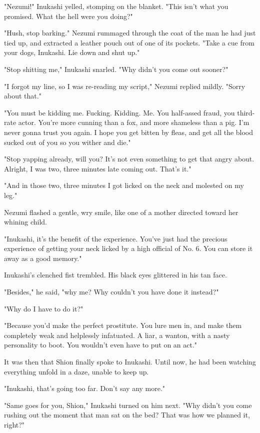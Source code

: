 \mybreak

"Nezumi!" Inukashi yelled, stomping on the blanket. "This isn't what you
promised. What the hell were you doing?"

"Hush, stop barking." Nezumi rummaged through the coat of the man he had
just tied up, and extracted a leather pouch out of one of its pockets.
"Take a cue from your dogs, Inukashi. Lie down and shut up."

"Stop shitting me," Inukashi snarled. "Why didn't you come out sooner?"

"I forgot my line, so I was re-reading my script," Nezumi replied
mildly. "Sorry about that."

"You must be kidding me. Fucking. Kidding. Me. You half-assed fraud, you
third-rate actor. You're more cunning than a fox, and more shameless
than a pig. I'm never gonna trust you again. I hope you get bitten by
fleas, and get all the blood sucked out of you so you wither and die."

"Stop yapping already, will you? It's not even something to get that
angry about. Alright, I was two, three minutes late coming out. That's
it."

"And in those two, three minutes I got licked on the neck and molested
on my leg."

Nezumi flashed a gentle, wry smile, like one of a mother directed toward
her whining child.

"Inukashi, it's the benefit of the experience. You've just had the
precious experience of getting your neck licked by a high official of
No. 6. You can store it away as a good memory."

Inukashi's clenched fist trembled. His black eyes glittered in his tan
face.

"Besides," he said, "why me? Why couldn't you have done it instead?"

"Why do I have to do it?"

"Because you'd make the perfect prostitute. You lure men in, and make
them completely weak and helplessly infatuated. A liar, a wanton, with a
nasty personality to boot. You wouldn't even have to put on an act."

It was then that Shion finally spoke to Inukashi. Until now, he had been
watching everything unfold in a daze, unable to keep up.

"Inukashi, that's going too far. Don't say any more."

"Same goes for you, Shion," Inukashi turned on him next. "Why didn't you
come rushing out the moment that man sat on the bed? That was how we
planned it, right?"

